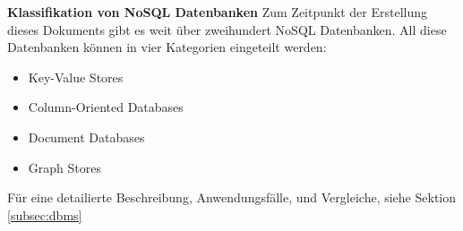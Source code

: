 \textbf{Klassifikation von NoSQL Datenbanken\newline}
Zum Zeitpunkt der Erstellung dieses Dokuments gibt es weit über zweihundert NoSQL Datenbanken\cite{MELD.CH2-noSQL.listOfNoSQLDB}. All diese Datenbanken können in vier Kategorien eingeteilt werden:

\begin{itemize}
	\item Key-Value Stores
	\item Column-Oriented Databases
	\item Document Databases
	\item Graph Stores
\end{itemize}

Für eine detailierte Beschreibung, Anwendungsfälle, und Vergleiche, siehe Sektion \ref{subsec:dbms}

\clearpage